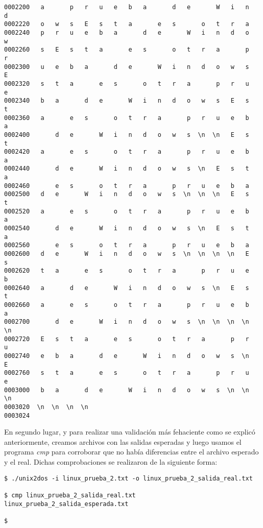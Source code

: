 \documentclass[a4paper,11pt]{article}
\begin{document}
\begin{itemize}
\begin{verbatim}
0002200   a       p   r   u   e   b   a       d   e       W   i   n   d
0002220   o   w   s   E   s   t   a       e   s       o   t   r   a    
0002240   p   r   u   e   b   a       d   e       W   i   n   d   o   w
0002260   s   E   s   t   a       e   s       o   t   r   a       p   r
0002300   u   e   b   a       d   e       W   i   n   d   o   w   s   E
0002320   s   t   a       e   s       o   t   r   a       p   r   u   e
0002340   b   a       d   e       W   i   n   d   o   w   s   E   s   t
0002360   a       e   s       o   t   r   a       p   r   u   e   b   a
0002400       d   e       W   i   n   d   o   w   s  \n  \n   E   s   t
0002420   a       e   s       o   t   r   a       p   r   u   e   b   a
0002440       d   e       W   i   n   d   o   w   s  \n   E   s   t   a
0002460       e   s       o   t   r   a       p   r   u   e   b   a    
0002500   d   e       W   i   n   d   o   w   s  \n  \n  \n   E   s   t
0002520   a       e   s       o   t   r   a       p   r   u   e   b   a
0002540       d   e       W   i   n   d   o   w   s  \n   E   s   t   a
0002560       e   s       o   t   r   a       p   r   u   e   b   a    
0002600   d   e       W   i   n   d   o   w   s  \n  \n  \n  \n   E   s
0002620   t   a       e   s       o   t   r   a       p   r   u   e   b
0002640   a       d   e       W   i   n   d   o   w   s  \n   E   s   t
0002660   a       e   s       o   t   r   a       p   r   u   e   b   a
0002700       d   e       W   i   n   d   o   w   s  \n  \n  \n  \n  \n
0002720   E   s   t   a       e   s       o   t   r   a       p   r   u
0002740   e   b   a       d   e       W   i   n   d   o   w   s  \n   E
0002760   s   t   a       e   s       o   t   r   a       p   r   u   e
0003000   b   a       d   e       W   i   n   d   o   w   s  \n  \n  \n
0003020  \n  \n  \n  \n
0003024
\end{verbatim}
\end{itemize}

En segundo lugar, y para realizar una validación más fehaciente como se explic\'o anteriormente, creamos archivos con las salidas esperadas y luego usamos el programa \textit{cmp} para corroborar que no hab\'ia diferencias entre el archivo esperado y el real. Dichas comprobaciones se realizaron de la siguiente forma:

\begin{verbatim}
$ ./unix2dos -i linux_prueba_2.txt -o linux_prueba_2_salida_real.txt

$ cmp linux_prueba_2_salida_real.txt linux_prueba_2_salida_esperada.txt

$
\end{verbatim}
\end{document}
